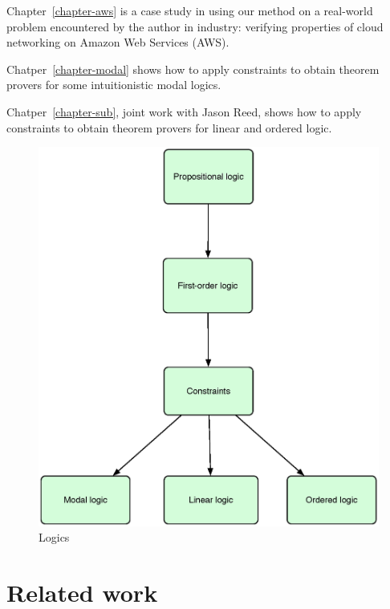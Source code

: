 Chapter~\ref{chapter-aws} is a case study in using our method on a real-world
problem encountered by the author in industry: verifying properties of
cloud networking on Amazon Web Services (AWS).

Chatper~\ref{chapter-modal} shows how to apply constraints to obtain theorem
provers for some intuitionistic modal logics.

Chatper~\ref{chapter-sub}, joint work with Jason Reed, shows how to apply
constraints to obtain theorem provers for linear and ordered logic.

\begin{figure}[H]
  \begin{center}
    \includegraphics[scale=0.50]{figs/logics.eps}
  \end{center}
  \caption{Logics}
  \label{figure.logics}
\end{figure}

\section{Related work}

